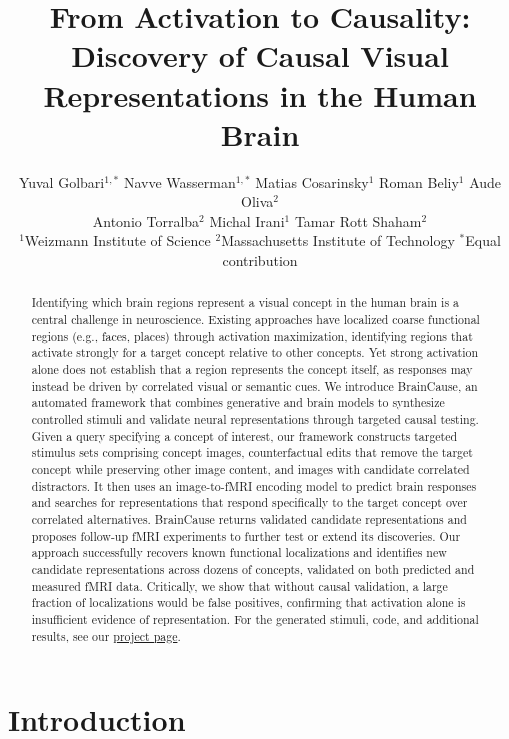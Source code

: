 \documentclass{article}
\title{From Activation to Causality: Discovery of Causal Visual Representations in the Human Brain}
\author{%
  \normalfont
  Yuval Golbari$^{1,*}$ \quad
  Navve Wasserman$^{1,*}$ \quad
  Matias Cosarinsky$^{1}$ \quad
  Roman Beliy$^{1}$ \quad
  Aude Oliva$^{2}$  \\
  Antonio Torralba$^{2}$ \quad
  Michal Irani$^{1}$ \quad
  Tamar Rott Shaham$^{2}$ \\[6pt]
  {\small $^{1}$Weizmann Institute of Science} \quad
  {\small $^{2}$Massachusetts Institute of Technology} \quad
  {\small $^{*}$Equal contribution}
}
\begin{document}
\maketitle

\begin{abstract}

Identifying which brain regions represent a visual concept in the human brain is a central challenge in neuroscience. Existing approaches have localized coarse functional regions (e.g., faces, places) through activation maximization, identifying regions that activate strongly for a target concept relative to other concepts. Yet strong activation alone does not establish that a region represents the concept itself, as responses may instead be driven by correlated visual or semantic cues.
We introduce BrainCause, an automated framework that combines generative and brain models to synthesize controlled stimuli and validate neural representations through targeted causal testing. Given a query specifying a concept of interest, our framework constructs targeted stimulus sets comprising concept images, counterfactual edits that remove the target concept while preserving other image content, and images with candidate
correlated distractors. It then uses an image-to-fMRI encoding model to predict brain responses and searches for representations that respond specifically to the target concept over correlated alternatives. BrainCause returns validated candidate representations and proposes follow-up fMRI experiments to further test or extend its discoveries. Our approach successfully recovers known functional localizations and identifies new candidate representations across dozens of concepts, validated on both predicted and measured fMRI data. Critically, we show that without causal validation, a large fraction of localizations would be false positives, confirming that activation alone is insufficient evidence of representation.
For the generated stimuli, code, and additional results, see our \href{https://yuvalgol123.github.io/BrainCause/}{project page}.


\end{abstract}



\section{Introduction}
\end{document}
